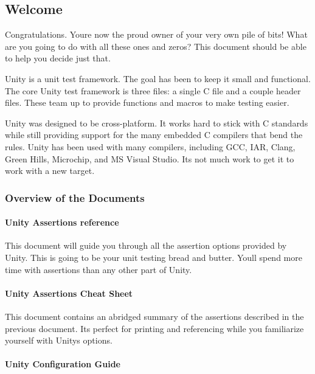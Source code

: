 \subsection*{Welcome}

Congratulations. You\textquotesingle{}re now the proud owner of your very own pile of bits! What are you going to do with all these ones and zeros? This document should be able to help you decide just that.

Unity is a unit test framework. The goal has been to keep it small and functional. The core Unity test framework is three files\+: a single C file and a couple header files. These team up to provide functions and macros to make testing easier.

Unity was designed to be cross-\/platform. It works hard to stick with C standards while still providing support for the many embedded C compilers that bend the rules. Unity has been used with many compilers, including G\+CC, I\+AR, Clang, Green Hills, Microchip, and MS Visual Studio. It\textquotesingle{}s not much work to get it to work with a new target.

\subsubsection*{Overview of the Documents}

\paragraph*{Unity Assertions reference}

This document will guide you through all the assertion options provided by Unity. This is going to be your unit testing bread and butter. You\textquotesingle{}ll spend more time with assertions than any other part of Unity.

\paragraph*{Unity Assertions Cheat Sheet}

This document contains an abridged summary of the assertions described in the previous document. It\textquotesingle{}s perfect for printing and referencing while you familiarize yourself with Unity\textquotesingle{}s options.

\paragraph*{Unity Configuration Guide}

